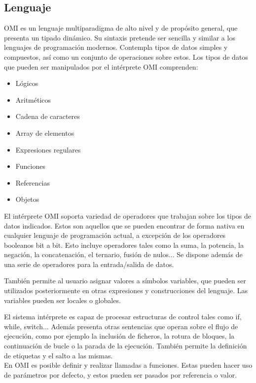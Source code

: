 \subsection{Lenguaje} 
OMI es un lenguaje multiparadigma de alto nivel y de propósito general, que presenta un tipado dinámico. Su sintaxis pretende 
ser sencilla y similar a los lenguajes de programación modernos. 
Contempla tipos de datos simples y compuestos, así como un conjunto de operaciones sobre estos. Los tipos de datos que pueden ser 
manipulados por el intérprete OMI comprenden:
\begin{itemize}
  \item Lógicos
  \item Aritméticos
  \item Cadena de caracteres
  \item Array de elementos
  \item Expresiones regulares
  \item Funciones
  \item Referencias
  \item Objetos
\end{itemize}

El intérprete OMI soporta variedad de operadores que trabajan sobre los tipos de datos indicados. Estos son aquellos que se pueden encontrar de forma
nativa en cualquier lenguaje de programación actual, a excepción de los operadores booleanos bit a bit. Esto incluye operadores tales como 
la suma, la potencia, la negación, la concatenación, el ternario, fusión de nulos... Se dispone además de una serie de operadores para la entrada/salida de datos. 

También permite al usuario asignar valores a símbolos variables, que pueden ser utilizados posteriormente en otras expresiones y construcciones del lenguaje. Las 
variables pueden ser locales o globales.

El sistema intérprete es capaz de procesar estructuras de control tales como if, while, switch... Además presenta otras sentencias que operan sobre el flujo de ejecución, 
como por ejemplo la inclusión de ficheros, la rotura de bloques, la continuación de bucle o la parada de la ejecución. También permite la definición de etiquetas y el salto a las mismas.\\

En OMI es posible definir y realizar llamadas a funciones. Estas pueden hacer uso de parámetros por defecto, y estos pueden 
ser pasados por referencia o valor.

